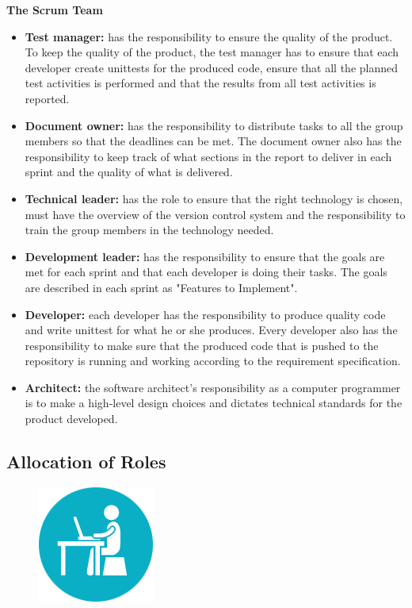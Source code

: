\noindent
{\bf The Scrum Team}
\begin{itemize}

  \item {\bf Test manager:} has the responsibility to ensure the quality of the product. To keep the quality of the product, the test manager has to ensure that each developer create unittests for the produced code, ensure that all the planned test activities is performed and that the results from all test activities is reported.

  \item {\bf Document owner:} has the responsibility to distribute tasks to all the group members so that the deadlines can be met. The document owner also has the responsibility to keep track of what sections in the report to deliver in each sprint and the quality of what is delivered.

  \item {\bf Technical leader:} has the role to ensure that the right technology is chosen, must have the overview of the version control system and the responsibility to train the group members in the technology needed.

  \item {\bf Development leader:} has the responsibility to ensure that the goals are met for each sprint and that each developer is doing their tasks. The goals are described in each sprint as "Features to Implement". 

  \item {\bf Developer:} each developer has the responsibility to produce quality code and write unittest for what he or she produces. Every developer also has the responsibility to make sure that the produced code that is pushed to the repository is running and working according to the requirement specification.

  \item{\bf Architect:} the software architect's responsibility as a computer programmer is to make a high-level design choices and dictates technical standards for the product developed. \cite{architect}

  \end{itemize} 

\subsection{Allocation of Roles}
\begin{figure}
  \begin{center}
  \includegraphics[scale=0.7]{pictures/Work.png}
  \end{center}
\end{figure}

